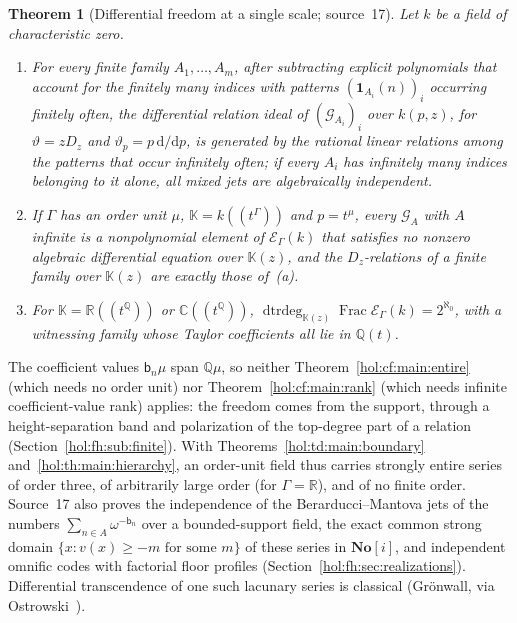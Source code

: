 \documentclass[11pt]{article}
\numberwithin{equation}{section}
\newtheorem{maintheorem}{Theorem}
\theoremstyle{definition}
\theoremstyle{remark}
\newcommand{\C}{\mathbb C}
\newcommand{\R}{\mathbb R}
\newcommand{\Q}{\mathbb Q}
\newcommand{\No}{\mathbf{No}}
\newcommand{\KK}{\mathbb K}
\newcommand{\EK}{\mathcal E_\Gamma(k)}
\newcommand{\FE}{\operatorname{Frac}\EK}
\newcommand{\dtrdeg}{\operatorname{dtrdeg}}
\begin{document}
\begin{maintheorem}[Differential freedom at a single scale; source~17]
\label{hol:fh:main:single}
Let $k$ be a field of characteristic zero.
\begin{enumerate}[label=\textup{(\alph*)}]
\item For every finite family $A_1,\ldots,A_m$, after subtracting explicit
polynomials that account for the finitely many indices with patterns
$(\mathbf 1_{A_i}(n))_i$ occurring finitely often, the differential relation
ideal of $(\mathcal G_{A_i})_i$ over $k(p,z)$, for $\vartheta=zD_z$ and
$\vartheta_p=p\,\mathrm d/\mathrm dp$, is generated by the rational linear
relations among the patterns that occur infinitely often; if every $A_i$ has
infinitely many indices belonging to it alone, all mixed jets are
algebraically independent.
\item If $\Gamma$ has an order unit $\mu$, $\KK=k((t^\Gamma))$ and $p=t^\mu$,
every $\mathcal G_A$ with $A$ infinite is a nonpolynomial element of $\EK$ that
satisfies no nonzero algebraic differential equation over $\KK(z)$, and the
$D_z$-relations of a finite family over $\KK(z)$ are exactly those of~(a).
\item For $\KK=\R((t^\Q))$ or $\C((t^\Q))$, $\dtrdeg_{\KK(z)}\FE=2^{\aleph_0}$,
with a witnessing family whose Taylor coefficients all lie in $\Q(t)$.
\end{enumerate}
\end{maintheorem}

The coefficient values $\mathsf b_n\mu$ span $\Q\mu$, so neither
Theorem~\ref{hol:cf:main:entire} (which needs no order unit) nor
Theorem~\ref{hol:cf:main:rank} (which needs infinite coefficient-value rank)
applies: the freedom comes from the support, through a height-separation band
and polarization of the top-degree part of a relation
(Section~\ref{hol:fh:sub:finite}). With Theorems~\ref{hol:td:main:boundary}
and~\ref{hol:th:main:hierarchy}, an order-unit field thus carries strongly
entire series of order three, of arbitrarily large order (for $\Gamma=\R$), and
of no finite order. Source~17 also proves the independence of the
Berarducci--Mantova jets of the numbers $\sum_{n\in A}\omega^{-\mathsf b_n}$ over
a bounded-support field, the exact common strong domain
$\{x:v(x)\ge-m\text{ for some }m\}$ of these series in $\No[i]$, and
independent omnific codes with factorial floor profiles
(Section~\ref{hol:fh:sec:realizations}). Differential transcendence of one such
lacunary series is classical (Gr\"onwall, via Ostrowski~\cite{ostrowski}).
\end{document}
